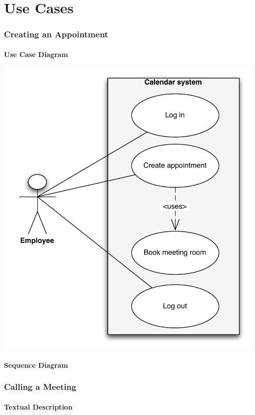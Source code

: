 \documentclass{article}
\begin{document}
\part{Use Cases}

\section{Creating an Appointment}

\subsection{Use Case Diagram}

\includegraphics[scale=0.9]{UseCase/usecaseFP1.pdf}

\subsection{Sequence Diagram}

\section{Calling a Meeting}

\subsection{Textual Description}
\end{document}
